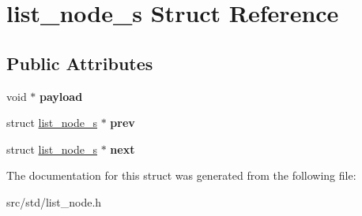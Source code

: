 \hypertarget{structlist__node__s}{}\section{list\+\_\+node\+\_\+s Struct Reference}
\label{structlist__node__s}
\subsection*{Public Attributes}
\begin{DoxyCompactItemize}
\item 
\mbox{\label{structlist__node__s_acc87a63abeb1cd8ebe69beebc12841e8}} 
void $\ast$ {\bfseries payload}
\item 
\mbox{\label{structlist__node__s_ae514915b0307961b3b347e8991ed3f12}} 
struct \hyperlink{structlist__node__s}{list\+\_\+node\+\_\+s} $\ast$ {\bfseries prev}
\item 
\mbox{\label{structlist__node__s_a792a4f814d8d0c2106c6a63b0abf666d}} 
struct \hyperlink{structlist__node__s}{list\+\_\+node\+\_\+s} $\ast$ {\bfseries next}
\end{DoxyCompactItemize}


The documentation for this struct was generated from the following file\+:\begin{DoxyCompactItemize}
\item 
src/std/list\+\_\+node.\+h\end{DoxyCompactItemize}
